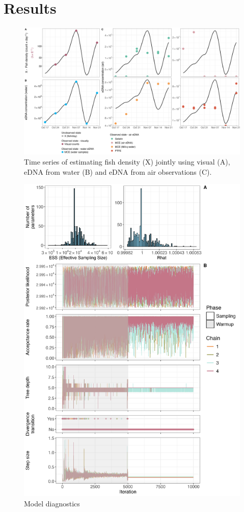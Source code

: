 \documentclass{article}
\begin{document}
\clearpage
\section{Results}

\begin{figure}[tbhp] 
\centering
\includegraphics[width=16.5cm]{Plots/Figure_1.jpg}  
\caption{Time series of estimating fish density (X) jointly using visual (A), eDNA from water (B) and eDNA from air observations (C).}
\label{fig:fig1}
\end{figure}


\begin{figure}[tbhp] 
\centering
\includegraphics[width=16.5cm]{Plots/Diagnostic_Fig_1.jpg}  
\caption{Model diagnostics}
\label{fig:diagnostics}
\end{figure}
\end{document}
